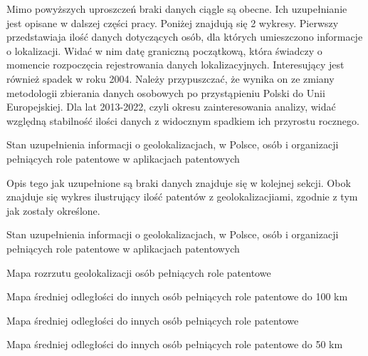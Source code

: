 \begin{multicols}{2}
Mimo powyższych uproszczeń braki danych ciągle są obecne. Ich uzupełnianie
jest opisane w dalszej części pracy. Poniżej znajdują się 2 wykresy. 
Pierwszy przedstawiaja ilość danych dotyczących osób, dla których 
umieszczono informacje o lokalizacji. Widać w nim datę graniczną początkową,
która świadczy o momencie rozpoczęcia rejestrowania danych lokalizacyjnych.
Interesujący jest również spadek w roku 2004. Należy przypuszczać, że wynika
on ze zmiany metodologii zbierania danych osobowych po przystąpieniu
Polski do Unii Europejskiej.
Dla lat 2013-2022, czyli okresu zainteresowania analizy,
widać względną stabilność ilości danych z widocznym
spadkiem ich przyrostu rocznego. 

\columnbreak
{}
{ Stan uzupełnienia informacji
  o geolokalizacjach,
  w Polsce,
  osób i organizacji 
  pełniących role patentowe 
  w aplikacjach patentowych}

\end{multicols}


\newpage
\begin{multicols}{2}

Opis tego jak uzupełnione są braki danych znajduje się w kolejnej sekcji.
Obok znajduje się wykres ilustrujący ilość patentów z geolokalizacjiami,
zgodnie z tym jak zostały określone.

{ Stan uzupełnienia informacji o geolokalizacjach, w Polsce, 
  osób i organizacji  pełniących role patentowe
  w aplikacjach patentowych}

\end{multicols}

\newpage
\begin{multicols}{2}

{Mapa rozrzutu geolokalizacji osób pełniących role patentowe}

{Mapa średniej odległości do innych osób pełniących role patentowe do 100 km}

\columnbreak

{Mapa średniej odległości do innych osób pełniących role patentowe}

{Mapa średniej odległości do innych osób pełniących role patentowe do 50 km}

\end{multicols}

